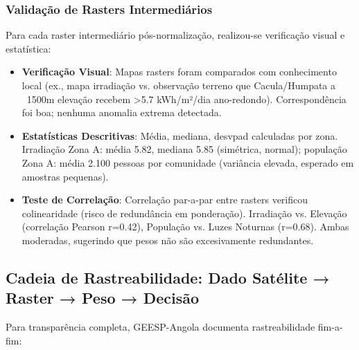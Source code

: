 \documentclass[12pt, a4paper]{article}
\begin{document}
\subsubsection{Validação de Rasters Intermediários}

Para cada raster intermediário pós-normalização, realizou-se verificação visual e estatística:

\begin{itemize}
\item \textbf{Verificação Visual}: Mapas rasters foram comparados com conhecimento local (ex., mapa irradiação vs. observação terreno que Cacula/Humpata a ~1500m elevação recebem >5.7 kWh/m²/dia ano-redondo). Correspondência foi boa; nenhuma anomalia extrema detectada.

\item \textbf{Estatísticas Descritivas}: Média, mediana, desvpad calculadas por zona. Irradiação Zona A: média 5.82, mediana 5.85 (simétrica, normal); população Zona A: média 2.100 pessoas por comunidade (variância elevada, esperado em amostras pequenas).

\item \textbf{Teste de Correlação}: Correlação par-a-par entre rasters verificou colinearidade (risco de redundância em ponderação). Irradiação vs. Elevação (correlação Pearson r=0.42), População vs. Luzes Noturnas (r=0.68). Ambas moderadas, sugerindo que pesos não são excesivamente redundantes.
\end{itemize}

\subsection{Cadeia de Rastreabilidade: Dado Satélite → Raster → Peso → Decisão}

Para transparência completa, GEESP-Angola documenta rastreabilidade fim-a-fim:
\end{document}
